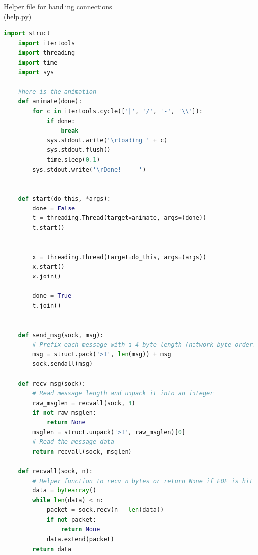 \documentclass{article}
\begin{document}
\pagebreak
\begin{center}
    Helper file for handling connections \\ (help.py)
\end{center}
\begin{lstlisting}[language=Python]
    import struct
    import itertools
    import threading
    import time
    import sys

    #here is the animation
    def animate(done):
        for c in itertools.cycle(['|', '/', '-', '\\']):
            if done:
                break
            sys.stdout.write('\rloading ' + c)
            sys.stdout.flush()
            time.sleep(0.1)
        sys.stdout.write('\rDone!     ')


    def start(do_this, *args):
        done = False
        t = threading.Thread(target=animate, args=(done))
        t.start()

        
        x = threading.Thread(target=do_this, args=(args))
        x.start()
        x.join()

        done = True
        t.join()


    def send_msg(sock, msg):
        # Prefix each message with a 4-byte length (network byte order)
        msg = struct.pack('>I', len(msg)) + msg
        sock.sendall(msg)

    def recv_msg(sock):
        # Read message length and unpack it into an integer
        raw_msglen = recvall(sock, 4)
        if not raw_msglen:
            return None
        msglen = struct.unpack('>I', raw_msglen)[0]
        # Read the message data
        return recvall(sock, msglen)

    def recvall(sock, n):
        # Helper function to recv n bytes or return None if EOF is hit
        data = bytearray()
        while len(data) < n:
            packet = sock.recv(n - len(data))
            if not packet:
                return None
            data.extend(packet)
        return data
\end{lstlisting}
\end{document}
